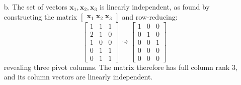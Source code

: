 \documentclass[11pt]{article}
\theoremstyle{definition}
\theoremstyle{plain}
\theoremstyle{remark}
\begin{document}
\begin{enumerate}
\begin{enumerate}
              \item[b.] The set of vectors \(\mathbf{x}_1, \mathbf{x}_2, \mathbf{x}_3\) is linearly independent, as found
                    by constructing the matrix \(\begin{bmatrix}
                        \mathbf{x}_1 \; \mathbf{x}_2 \; \mathbf{x}_3
                    \end{bmatrix}\) and row-reducing:
                    \[
                        \begin{bmatrix}
                            1 & 1 & 1 \\
                            2 & 1 & 0 \\
                            1 & 0 & 0 \\
                            0 & 1 & 1 \\
                            0 & 1 & 1
                        \end{bmatrix}
                        \rightsquigarrow
                        \begin{bmatrix}
                            1 & 0 & 0 \\
                            0 & 1 & 0 \\
                            0 & 0 & 1 \\
                            0 & 0 & 0 \\
                            0 & 0 & 0
                        \end{bmatrix}
                    \]
                    revealing three pivot columns. The matrix therefore has full column rank \(3\), and its column
                    vectors are linearly independent.

          \end{enumerate}


\end{enumerate}
\end{document}
